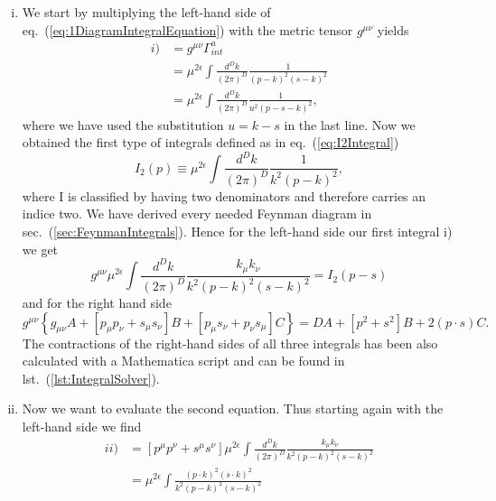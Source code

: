 	\begin{enumerate}[i)]
		\item 
			We start by multiplying the left-hand side of eq.~(\ref{eq:1DiagramIntegralEquation}) with the metric tensor $g^{\mu\nu}$ yields 
			\begin{equation}
				\label{eq:aiIntegral}
				\begin{split}
					i) &= g^{\mu\nu}\Gamma^a_{int} \\
					 &= \mu^{2\epsilon}\int\frac{d^Dk}{(2\pi)^D}\frac{1}{(p-k)^2(s-k)^2} \\
					&= \mu^{2\epsilon}\int\frac{d^Dk}{(2\pi)^D}\frac{1}{u^2(p-s-k)^2},
				\end{split}
			\end{equation}
			where we have used the substitution $u=k-s$ in the last line. Now we obtained the first type of integrals defined as in eq.~(\ref{eq:I2Integral}) 
			\begin{equation}	
				I_2(p) \equiv \mu^{2\epsilon}\int\frac{d^Dk}{(2\pi)^D}\frac{1}{k^2(p-k)^2},
			\end{equation}
			where I is classified by having two denominators and therefore carries an indice two. We have derived every needed Feynman diagram in sec.~(\ref{sec:FeynmanIntegrals}). Hence for the left-hand side our first integral i) we get
			\begin{equation}	
				g^{\mu\nu}\mu^{2\epsilon}\int\frac{d^Dk}{(2\pi)^D}\frac{k_\mu k_\nu}{k^2(p-k)^2(s-k)^2} = I_2(p-s) 
			\end{equation}
			and for the right hand side 
			\begin{equation}	
				g^{\mu\nu} \left\{ g_{\mu\nu}A + [p_\mu p_\nu + s_\mu s_\nu]B + [p_\mu s_\nu + p_\nu s_\mu]C \right\} = DA + [p^2+s^2]B + 2(p\cdot s)C.
			\end{equation}
			The contractions of the right-hand sides of all three integrals has been also calculated with a Mathematica script and can be found in lst.~(\ref{lst:IntegralSolver}).
		\item	
			Now we want to evaluate the second equation. Thus starting again with the left-hand side we find
			\begin{equation}
				\begin{split}
					ii) &= [p^\mu p^\nu + s^\mu s^\nu]\mu^{2\epsilon}\int\frac{d^Dk}{(2\pi)^D}\frac{k_\mu k_\nu}{k^2(p-k)^2(s-k)^2} \\
					&= \mu^{2\epsilon}\int\frac{(p \cdot k)^2 (s \cdot k)^2}{k^2(p-k)^2(s-k)^2} \\

\end{split}
\end{equation}
\end{enumerate}
